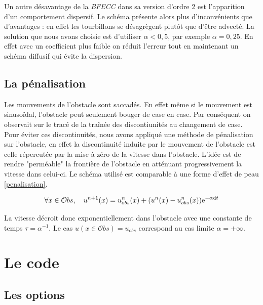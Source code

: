 		Un autre désavantage de la \emph{BFECC} dans sa version d'ordre 2 est l'apparition d'un comportement dispersif. Le schéma présente alors plus d'inconvénients que d'avantages : en effet les tourbillons se désagrègent plutôt que d'être advecté. La solution que nous avons choisie est d'utiliser $\alpha < 0,5$, par exemple $\alpha = 0,25$. En effet avec un coefficient plus faible on réduit l'erreur tout en maintenant un schéma diffusif qui évite la dispersion.
	
	\subsection{La pénalisation}

		Les mouvements de l'obstacle sont saccadés. En effet même si le mouvement est sinusoïdal, l'obstacle peut seulement bouger de case en case. Par conséquent on observait sur le tracé de la traînée des discontiunités au changement de case. Pour éviter ces discontinuités, nous avons appliqué une méthode de pénalisation sur l'obstacle, en effet la discontinuité induite par le mouvement de l'obstacle est celle répercutée par la mise à zéro de la vitesse dans l'obstacle. L'idée est de rendre "perméable" la frontière de l'obstacle en atténuant progressivement la vitesse dans celui-ci. Le schéma utilisé est comparable à une forme d'effet de peau \eqref{penalisation}. 
		
		\begin{equation}
			\forall x \in \mathcal{O}bs, \ \ \
			u^{n+1}(x)= u^n_{obs}(x) + (u^n(x)-u^n_{obs}(x))\mathrm{e}^{-\alpha\mathrm{d}t}
			\label{penalisation}
		\end{equation}
		
		La vitesse décroit donc exponentiellement dans l'obstacle avec une constante de temps $\tau= \alpha^{-1}$. Le cas $u(x\in \mathcal{O}bs)=u_{obs}$ correspond au cas limite $\alpha = +\infty$.


\section{Le code}

	\subsection{Les options}
		
